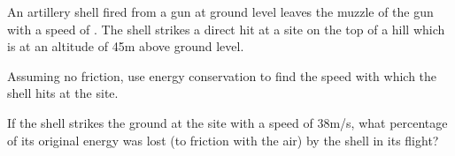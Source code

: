 {\begin{two-digit-list}
\item [22.] \noindent {}\newline
An artillery shell fired from a gun at ground level leaves the muzzle of the
gun with a speed of .
The shell strikes a direct hit at a site on the top of a hill which is at an
altitude of 45\unit{m} above ground level.
\begin{one-digit-list}
\item [a.] Assuming no friction, use energy conservation to find the speed
with which the shell hits at the site. 
\item [b.] If the shell strikes the ground at the site with a speed of
38\unit{m/s}, what percentage of its original energy was lost (to friction with
the air) by the shell in its flight? 
\end{one-digit-list}
\end{two-digit-list}

\newpage

\BriefAns

}
